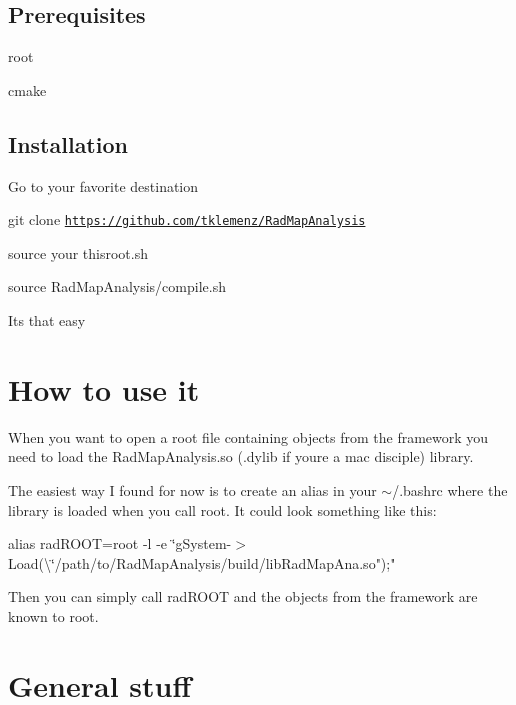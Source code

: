 \subsection*{Prerequisites}


\begin{DoxyItemize}
\item root
\item cmake
\end{DoxyItemize}

\subsection*{Installation}


\begin{DoxyEnumerate}
\item Go to your favorite destination
\item {\ttfamily git clone \href{https://github.com/tklemenz/RadMapAnalysis}{\tt https\+://github.\+com/tklemenz/\+Rad\+Map\+Analysis}}
\item source your {\ttfamily thisroot.\+sh}
\item {\ttfamily source Rad\+Map\+Analysis/compile.\+sh}
\item It\textquotesingle{}s that easy
\end{DoxyEnumerate}

\section*{How to use it}

When you want to open a root file containing objects from the framework you need to load the Rad\+Map\+Analysis.\+so (.dylib if you\textquotesingle{}re a mac disciple) library.

The easiest way I found for now is to create an alias in your {\ttfamily $\sim$/.bashrc} where the library is loaded when you call {\ttfamily root}. It could look something like this\+:

{\ttfamily alias rad\+R\+O\+OT=\textquotesingle{}root -\/l -\/e \char`\"{}g\+System-\/$>$\+Load(\textbackslash{}\char`\"{}/path/to/\+Rad\+Map\+Analysis/build/lib\+Rad\+Map\+Ana.so");"\textquotesingle{}}

Then you can simply call {\ttfamily rad\+R\+O\+OT} and the objects from the framework are known to root.

\section*{General stuff}


